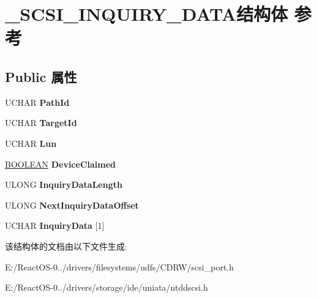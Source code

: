 \hypertarget{struct___s_c_s_i___i_n_q_u_i_r_y___d_a_t_a}{}\section{\+\_\+\+S\+C\+S\+I\+\_\+\+I\+N\+Q\+U\+I\+R\+Y\+\_\+\+D\+A\+T\+A结构体 参考}
\label{struct___s_c_s_i___i_n_q_u_i_r_y___d_a_t_a}
\subsection*{Public 属性}
\begin{DoxyCompactItemize}
\item 
\mbox{\label{struct___s_c_s_i___i_n_q_u_i_r_y___d_a_t_a_a8bc5b3fa26eb972c6bbd50483103b6dd}} 
U\+C\+H\+AR {\bfseries Path\+Id}
\item 
\mbox{\label{struct___s_c_s_i___i_n_q_u_i_r_y___d_a_t_a_a0e6d0caed8161a0160f422fe1df15809}} 
U\+C\+H\+AR {\bfseries Target\+Id}
\item 
\mbox{\label{struct___s_c_s_i___i_n_q_u_i_r_y___d_a_t_a_a7e9c13d67568207301428c2368157cc9}} 
U\+C\+H\+AR {\bfseries Lun}
\item 
\mbox{\label{struct___s_c_s_i___i_n_q_u_i_r_y___d_a_t_a_ab373f68446e8597e3a4a7847197ab329}} 
\hyperlink{_processor_bind_8h_a112e3146cb38b6ee95e64d85842e380a}{B\+O\+O\+L\+E\+AN} {\bfseries Device\+Claimed}
\item 
\mbox{\label{struct___s_c_s_i___i_n_q_u_i_r_y___d_a_t_a_aa55e87089de5aed9c4b0323dacd48449}} 
U\+L\+O\+NG {\bfseries Inquiry\+Data\+Length}
\item 
\mbox{\label{struct___s_c_s_i___i_n_q_u_i_r_y___d_a_t_a_a66499abc1737784117fcf194ed999f6f}} 
U\+L\+O\+NG {\bfseries Next\+Inquiry\+Data\+Offset}
\item 
\mbox{\label{struct___s_c_s_i___i_n_q_u_i_r_y___d_a_t_a_a28a3b31433c34371aaed1b6c31291a05}} 
U\+C\+H\+AR {\bfseries Inquiry\+Data} \mbox{[}1\mbox{]}
\end{DoxyCompactItemize}


该结构体的文档由以下文件生成\+:\begin{DoxyCompactItemize}
\item 
E\+:/\+React\+O\+S-\/0../drivers/filesystems/udfs/\+C\+D\+R\+W/scsi\+\_\+port.\+h\item 
E\+:/\+React\+O\+S-\/0../drivers/storage/ide/uniata/ntddscsi.\+h\end{DoxyCompactItemize}
